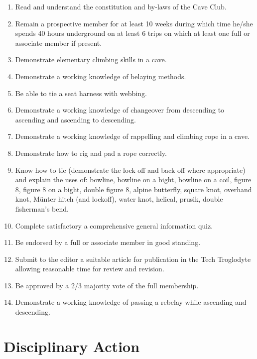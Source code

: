 \documentclass[
]{article}
\providecommand{\tightlist}{%
  \setlength{\itemsep}{0pt}\setlength{\parskip}{0pt}}
\begin{document}
\begin{enumerate}
  \begin{enumerate}
  \def\labelenumii{\Alph{enumii}.}
  \tightlist
  \item
    Read and understand the constitution and by-laws of the Cave Club.
  \item
    Remain a prospective member for at least 10 weeks during which time
    he/she spends 40 hours underground on at least 6 trips on which at
    least one full or associate member if present.
  \item
    Demonstrate elementary climbing skills in a cave.
  \item
    Demonstrate a working knowledge of belaying methods.
  \item
    Be able to tie a seat harness with webbing.
  \item
    Demonstrate a working knowledge of changeover from descending to
    ascending and ascending to descending.
  \item
    Demonstrate a working knowledge of rappelling and climbing rope in a
    cave.
  \item
    Demonstrate how to rig and pad a rope correctly.
  \item
    Know how to tie (demonstrate the lock off and back off where
    appropriate) and explain the uses of: bowline, bowline on a bight,
    bowline on a coil, figure 8, figure 8 on a bight, double figure 8,
    alpine butterfly, square knot, overhand knot, Münter hitch (and
    lockoff), water knot, helical, prusik, double fisherman's bend.
  \item
    Complete satisfactory a comprehensive general information quiz.
  \item
    Be endorsed by a full or associate member in good standing.
  \item
    Submit to the editor a suitable article for publication in the Tech
    Troglodyte allowing reasonable time for review and revision.
  \item
    Be approved by a 2/3 majority vote of the full membership.
  \item
    Demonstrate a working knowledge of passing a rebelay while ascending
    and descending.
  \end{enumerate}
\end{enumerate}

\hypertarget{disciplinary-action}{%
\section{Disciplinary Action}\label{disciplinary-action}}
\end{document}
